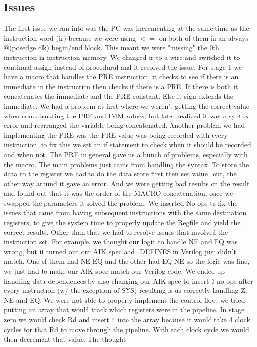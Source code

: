 \documentclass{article}
\begin{document}
\begin{multicols}{2}
  \section{Issues}
The first issue we ran into was the PC was incrementing at the same time as the instruction word (ir) because we were using $<=$
on both of them in an always @(posedge clk) begin/end block. This meant we were "missing" the 0th instruction in instruction
memory. We changed ir to a wire and switched it to continual assign instead of procedural and it resolved the issue. For stage 1
we have a macro that handles the PRE instruction, it checks to see if there is an immediate in the instruction then checks if
there is a PRE. If there is both it concatenates the immediate and the PRE constant. Else it sign extends the immediate. We
had a problem at first where we weren't getting the correct value when concatenating the PRE and IMM values, but later
realized it was a syntax error and rearranged the variable being concatenated. Another problem we had implementing the PRE
was the PRE value was being recorded with every instruction, to fix this we set an if statement to check when it should be
recorded and when not. The PRE in general gave us a bunch of problems, especially with the macro. The main problems just
came from handling the syntax. To store the data to the register we had to do the data store first then set value\_out, the other
way around it gave an error. And we were getting bad results on the result and found out that it was the order of the MACRO
concatenation, once we swapped the parameters it solved the problem. We inserted No-ops to fix the issues that came from
having subsequent instructions with the same destination registers, to give the system time to properly update the Regfile and
yield the correct results. Other than that we had to resolve issues that involved the instruction set. For example, we thought our
logic to handle NE and EQ was wrong, but it turned out our AIK spec and $`$DEFINES in Verilog just didn't match. One of them
had NE EQ and the other had EQ NE so the logic was fine, we just had to make our AIK spec match our Verilog code. We ended up handling data
dependences by also changing our AIK spec to insert 3 no-ops after every instruction (w/ the exception of SYS) resulting is us
correctly handling Z, NE and EQ. We were not able to properly implement the control flow, we tried putting an array that would
track which registers were in the pipeline. In stage zero we would check Rd and insert 4 into the array because it would take
4 clock cycles for that Rd to move through the pipeline. With each clock cycle we would then decrement that value. The thought

\end{multicols}
\end{document}
